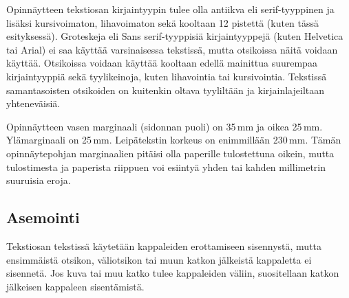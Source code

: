 \documentclass[finnish, 12pt, a4paper, elec, utf8, a-1b, online]{aaltothesis}
\begin{document}
Opinnäytteen tekstiosan kirjaintyypin tulee olla antiikva eli
serif\--tyyp\-pi\-nen ja lisäksi kursivoimaton, lihavoimaton sekä kooltaan 12
pistettä (kuten tässä esityksessä). Groteskeja eli \textsf{Sans serif}-tyyppisiä
kirjaintyyppejä (kuten Helvetica tai Arial) ei saa käyttää varsinaisessa
tekstissä, mutta otsikoissa näitä voidaan käyttää.  Otsikoissa voidaan käyttää
kooltaan edellä mainittua suurempaa kirjaintyyppiä sekä tyylikeinoja, kuten
lihavointia tai kursivointia. Tekstissä samantasoisten otsikoiden on kuitenkin
oltava tyyliltään ja kirjainlajeiltaan yhteneväisiä.

\begin{table}[htb]
\caption{Taulukoissa ja kuvissa kirjaintyypin voi valita
tarkoituksenmukaisesti, mutta kuva- ja taulukkoteksteissä tulee
käyttää samaa kirjaintyyppiä kuin varsinaisessa tekstissä.
Huomaa taulukon numeroinnin sijoittuminen taulukon yläpuolelle. \label{taulukko1}}
\centering
{}
\end{table}

Opinnäytteen vasen marginaali (sidonnan puoli) on
35\,mm %
ja oikea 25\,mm. Ylämarginaali on 25\,mm. Leipätekstin korkeus on
enimmillään 230\,mm. Tämän opinnäytepohjan marginaalien pitäisi olla
paperille tulostettuna oikein, mutta tulostimesta ja paperista
riippuen voi esiintyä yhden tai kahden millimetrin suuruisia eroja.
\subsection*{Asemointi}

Tekstiosan tekstissä käytetään kappaleiden erottamiseen sisennystä,
mutta ensimmäistä otsikon, väliotsikon tai muun katkon jälkeistä
kappaletta ei sisennetä. Jos kuva tai muu katko tulee kappaleiden
väliin, suositellaan katkon jälkeisen kappaleen sisentämistä.
\end{document}
